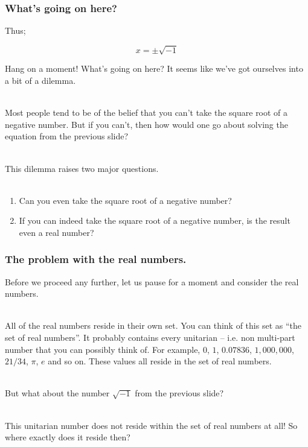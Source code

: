 \begin{frame}
\frametitle{What's going on here?}

Thus;

\begin{equation}
  x = \pm\sqrt{-1}
\end{equation}

Hang on a moment! What's going on here? It seems like we've got ourselves into a bit of a dilemma.\\~\

Most people tend to be of the belief that you can't take the square root of a negative number. But if you can't, then how would one go about solving
the equation from the previous slide?\\~\

This dilemma raises two major questions.\\~\

\begin{enumerate}
  \item Can you even take the square root of a negative number?
  \item If you can indeed take the square root of a negative number, is the result even a real number?
\end{enumerate}

\end{frame}


%
%

\begin{frame}
\frametitle{The problem with the real numbers.}

Before we proceed any further, let us pause for a moment and consider the real numbers.\\~\

All of the real numbers reside in their own set. You can think of this set as ``the set of real numbers''. It probably contains every unitarian -- i.e. 
non multi-part number that you can possibly think of. For example, \(0\), \(1\), \(0.07836\), \(1,000,000\), \(21/34\),
\(\pi\), \(e\) and so on. These values all reside in the set of real numbers.\\~\

But what about the number \(\sqrt{-1}\) from the previous slide?\\~\

This unitarian number does not reside within the set of real numbers at all! So where exactly does it reside then?\\~\

\end{frame}


